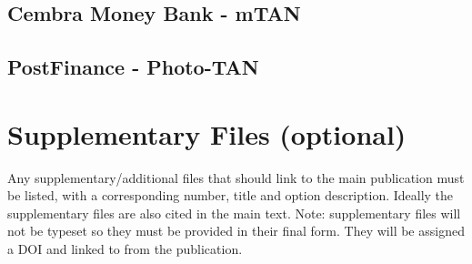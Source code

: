\documentclass[12pt]{article}
\begin{document}
\subsection{Cembra Money Bank - mTAN}
\subsection{PostFinance - Photo-TAN}

\section*{Supplementary Files (optional)}
Any supplementary/additional files that should link to the main publication must be listed, with a corresponding number, title and option description. Ideally the supplementary files are also cited in the main text.
Note: supplementary files will not be typeset so they must be provided in their final form. They will be assigned a DOI and linked to from the publication.

\printbibliography
\end{document}
